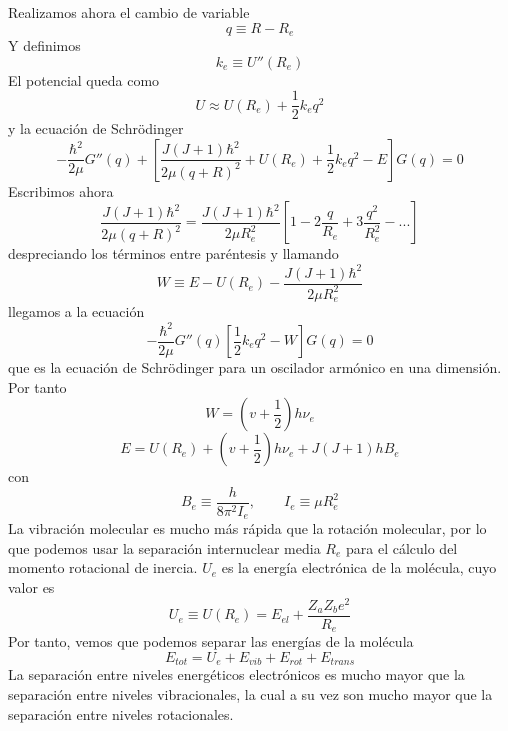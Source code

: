 \documentclass[a4paper]{article}
\begin{document}
Realizamos ahora el cambio de variable 
\begin{equation}
q \equiv R-R_e
\end{equation}
Y definimos 
\begin{equation}
k_e \equiv	U''(R_e)
\end{equation}
El potencial queda como
\begin{equation}
U \approx U(R_e)+\frac{1}{2}k_eq^2
\end{equation}
y la ecuación de Schrödinger
\begin{equation}
-\frac{\hbar^2}{2\mu}G''(q)+\left[\frac{J(J+1)\hbar^2}{2\mu (q+R)^2}+U(R_e)+\frac{1}{2}k_eq^2-E\right]G(q)=0
\end{equation}
Escribimos ahora
\begin{equation}
\frac{J(J+1)\hbar^2}{2\mu (q+R)^2}=\frac{J(J+1)\hbar^2}{2\mu R_e^2}\left[1-2\frac{q}{R_e}+3\frac{q^2}{R_e^2}-...\right]
\end{equation}
despreciando los términos entre paréntesis y llamando 
\begin{equation}
W \equiv	E-U(R_e)-\frac{J(J+1)\hbar^2}{2\mu R_e^2}
\end{equation}
llegamos a la ecuación
\begin{equation}
-\frac{\hbar^2}{2\mu}G''(q)\left[\frac{1}{2}k_eq^2-W\right] G(q)=0
\end{equation}
que es la ecuación de Schrödinger para un oscilador armónico en una dimensión. Por tanto
\begin{equation}
W=\left(v+\frac{1}{2}\right)h\nu_e
\end{equation}
\begin{equation}
E=U(R_e)+\left(v+\frac{1}{2}\right)h\nu_e+J(J+1)hB_e
\end{equation}
con
\begin{equation}
B_e \equiv	\frac{h}{8\pi^2I_e}, \qquad I_e\equiv \mu R_e^2
\end{equation}
La vibración molecular es mucho más rápida que la rotación molecular, por lo que podemos usar la separación internuclear media $R_e$ para el cálculo del momento rotacional de inercia.
$U_e$ es la energía electrónica de la molécula, cuyo valor es
\begin{equation}
U_e \equiv	U(R_e)=E_{el} +\frac{Z_aZ_be^2}{R_e}
\end{equation}
Por tanto, vemos que podemos separar las energías de la molécula
\begin{equation}
E_{tot} = U_e+E_{vib}+E_{rot}+E_{trans}
\end{equation}
La separación entre niveles energéticos electrónicos es mucho mayor que la separación entre niveles vibracionales, la cual a su vez son mucho mayor que la separación entre niveles rotacionales.\\
\end{document}
